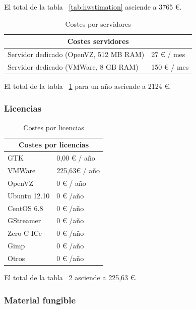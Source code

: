 El total de la tabla ~\ref{tab:hwstimation} asciende a 3765 €.

\begin{table}[ht]
    \centering
    \begin{tabular}{|l|l|}
      \hline
      \multicolumn{2}{|c|}{Costes servidores} \\
      \hline
       Servidor dedicado (OpenVZ, 512 MB RAM) & 27 € / mes\\
       Servidor dedicado (VMWare, 8 GB RAM) & 150 € / mes\\
      \hline
    \end{tabular}
    \caption{Costes por servidores}
     \label{tab:serverestimation}
\end{table}

El total de la tabla ~\ref{tab:serverestimation} para un año asciende a 2124 €.

\subsubsection{Licencias}

\begin{table}[ht]
    \centering
    \begin{tabular}{|l|l|}
      \hline
      \multicolumn{2}{|c|}{Costes por licencias} \\
      \hline
       GTK  & 0,00 € / año \\
       VMWare & 225,63€ / año\\
       OpenVZ & 0 € / año\\
       Ubuntu 12.10 & 0 € /año\\
       CentOS 6.8 & 0 € /año\\
       GStreamer & 0 € /año\\
       Zero C ICe & 0 € /año\\
       Gimp & 0 € /año\\
       Otros & 0 € /año\\
      \hline
    \end{tabular}
    \caption{Costes por licencias}
     \label{tab:licensestimation}
\end{table}

El total de la tabla ~\ref{tab:licensestimation} asciende a 225,63 €.

\newpage

\subsubsection{Material fungible}


